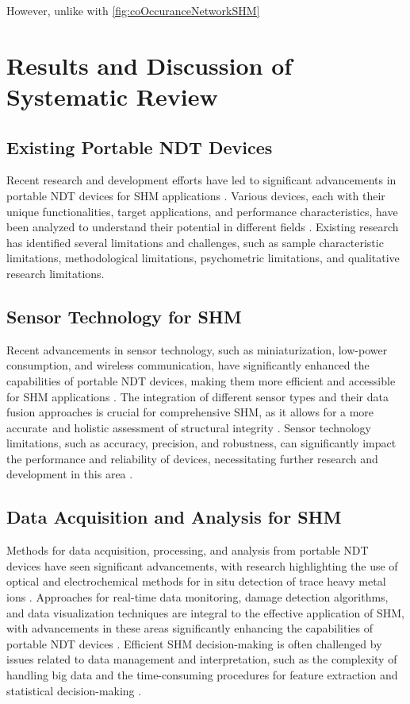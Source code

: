\documentclass[journal, a4paper]{IEEEtran}
\begin{document}
However, unlike with \autoref{fig:coOccuranceNetworkSHM} \lipsum[1]






\section{Results and Discussion of Systematic Review}

\subsection{Existing Portable NDT Devices}
Recent research and development efforts have led to significant advancements in portable NDT devices
for SHM applications \cite{Vijayan2023} \cite{Parsy2018} \cite{Hassani2023}.
Various devices, each with their unique functionalities, target applications, and performance characteristics,
have been analyzed to understand their potential in different fields \cite{Khanna2020} \cite{Baig2021} \cite{Corzo2020}.
Existing research has identified several limitations and challenges, such as sample characteristic limitations,
methodological limitations, psychometric limitations, and qualitative research limitations.


\subsection{Sensor Technology for SHM}
Recent advancements in sensor technology, such as miniaturization, low-power consumption, and wireless communication,
have significantly enhanced the capabilities of portable NDT devices,
making them more efficient and accessible for SHM applications \cite{Hassani2023} \cite{Valeske2020}.
The integration of different sensor types and their data fusion approaches is crucial
for comprehensive SHM, as it allows for a more accurate\
and holistic assessment of structural integrity \cite{Broer2022} \cite{Azimi2020}.
Sensor technology limitations, such as accuracy, precision, and robustness,
can significantly impact the performance and reliability of devices,
necessitating further research and development in this area \cite{Varshney2021} \cite{Moore2020}.


\subsection{Data Acquisition and Analysis for SHM}
Methods for data acquisition, processing, and analysis from portable NDT
devices have seen significant advancements, with research highlighting the use of optical
and electrochemical methods for in situ detection of trace heavy metal ions \cite{Hu2023}.
Approaches for real-time data monitoring, damage detection algorithms, and data visualization techniques
are integral to the effective application of SHM, with advancements in these areas
significantly enhancing the capabilities of portable NDT devices \cite{Azimi2020} \cite{Lingxin2022}.
Efficient SHM decision-making is often challenged by issues related
to data management and interpretation, such as the complexity of handling big data and the time-consuming procedures
for feature extraction and statistical decision-making \cite{Entezami2020}.
\end{document}
